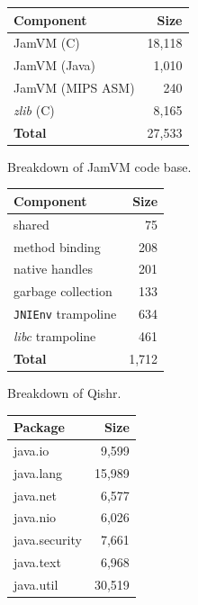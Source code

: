 \documentclass[a4paper,12pt,twoside,openright]{report}
\newcommand{\tool}[1]{\emph{#1}}
\newcommand{\lib}[1]{\tool{lib#1}}
\begin{document}
\begin{table}[h]
	\centering
	\begin{subfigure}{0.45\textwidth}
		\centering
		\footnotesize
		\begin{tabular}{|l|r|}
		\hline
		\bf Component		& \bf Size		\\
		\hline
		JamVM (C)		& 18,118		\\
		JamVM (Java)		& 1,010		\\
		JamVM (MIPS ASM)	& 240		\\
		\emph{zlib} (C)		& 8,165		\\
		\hline
		\bf Total		& 27,533	\\
		\hline
		\end{tabular}
		\caption{Breakdown of JamVM code base.}
		\label{table:JamTCB}
	\end{subfigure}
	\begin{subfigure}{0.45\textwidth}
		\centering
		\footnotesize
		\begin{tabular}{|l|r|}
		\hline
		\bf Component			& \bf Size		\\
		\hline
		shared			& 75			\\
		method binding	& 208 		\\
		native handles	& 201		\\
		garbage collection	& 133		\\				
		\texttt{JNIEnv} trampoline	& 634		\\
		\lib{c} trampoline	& 461		\\
		\hline
		\bf Total		& 1,712	\\
		\hline
		\end{tabular}
		\caption{Breakdown of Qishr.}
		\label{table:QishrTCB}
	\end{subfigure}
	\begin{subfigure}{0.45\textwidth}
		\centering
		\footnotesize
		\begin{tabular}{|l|r|}
		\hline
		\bf Package	& \bf Size		\\
		\hline
		java.io		& 9,599		\\ %
		java.lang		& 15,989		\\ %
		java.net		& 6,577		\\ %
		java.nio		& 6,026		\\ %
		java.security	& 7,661		\\ %
		java.text		& 6,968		\\ %
		java.util		& 30,519		\\ %

\end{tabular}
\end{subfigure}
\end{table}
\end{document}

